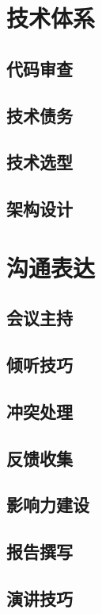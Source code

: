 \documentclass[openany,10pt,UTF8]{ctexbook}
\begin{document}
\part{技术体系}
\chapter{代码审查}

\chapter{技术债务}

\chapter{技术选型}

\chapter{架构设计}


\part{沟通表达}
\chapter{会议主持}

\chapter{倾听技巧}

\chapter{冲突处理}

\chapter{反馈收集}

\chapter{影响力建设}

\chapter{报告撰写}

\chapter{演讲技巧}

\end{document}
